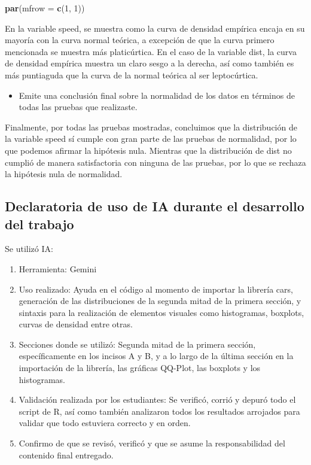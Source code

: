 \documentclass[
]{article}
\newenvironment{Shaded}{\begin{snugshade}}{\end{snugshade}}
\newcommand{\AttributeTok}[1]{\textcolor[rgb]{0.13,0.29,0.53}{#1}}
\newcommand{\DecValTok}[1]{\textcolor[rgb]{0.00,0.00,0.81}{#1}}
\newcommand{\FunctionTok}[1]{\textcolor[rgb]{0.13,0.29,0.53}{\textbf{#1}}}
\newcommand{\NormalTok}[1]{#1}
\providecommand{\tightlist}{%
  \setlength{\itemsep}{0pt}\setlength{\parskip}{0pt}}
\begin{document}
\begin{Shaded}
\begin{Highlighting}[]
\FunctionTok{par}\NormalTok{(}\AttributeTok{mfrow =} \FunctionTok{c}\NormalTok{(}\DecValTok{1}\NormalTok{, }\DecValTok{1}\NormalTok{))}
\end{Highlighting}
\end{Shaded}

En la variable speed, se muestra como la curva de densidad empírica
encaja en su mayoría con la curva normal teórica, a excepción de que la
curva primero mencionada se muestra más platicúrtica. En el caso de la
variable dist, la curva de densidad empírica muestra un claro sesgo a la
derecha, así como también es más puntiaguda que la curva de la normal
teórica al ser leptocúrtica.

\begin{itemize}
\tightlist
\item
  Emite una conclusión final sobre la normalidad de los datos en
  términos de todas las pruebas que realizaste.
\end{itemize}

Finalmente, por todas las pruebas mostradas, concluimos que la
distribución de la variable speed sí cumple con gran parte de las
pruebas de normalidad, por lo que podemos afirmar la hipótesis nula.
Mientras que la distribución de dist no cumplió de manera satisfactoria
con ninguna de las pruebas, por lo que se rechaza la hipótesis nula de
normalidad.

\subsection{Declaratoria de uso de IA durante el desarrollo del
trabajo}\label{declaratoria-de-uso-de-ia-durante-el-desarrollo-del-trabajo}

Se utilizó IA:

\begin{enumerate}
\def\labelenumi{(\arabic{enumi})}
\item
  Herramienta: Gemini
\item
  Uso realizado: Ayuda en el código al momento de importar la librería
  cars, generación de las distribuciones de la segunda mitad de la
  primera sección, y sintaxis para la realización de elementos visuales
  como histogramas, boxplots, curvas de densidad entre otras.
\item
  Secciones donde se utilizó: Segunda mitad de la primera sección,
  específicamente en los incisos A y B, y a lo largo de la última
  sección en la importación de la librería, las gráficas QQ-Plot, las
  boxplots y los histogramas.
\item
  Validación realizada por los estudiantes: Se verificó, corrió y depuró
  todo el script de R, así como también analizaron todos los resultados
  arrojados para validar que todo estuviera correcto y en orden.
\item
  Confirmo de que se revisó, verificó y que se asume la responsabilidad
  del contenido final entregado.
\end{enumerate}
\end{document}
